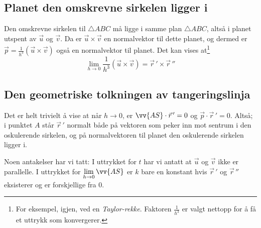 \subsection*{Planet den omskrevne sirkelen ligger i}
Den omskrevne sirkelen til $\triangle ABC$ må ligge i samme plan $\triangle ABC$, altså i planet utspent av $\vec{u}$ og $\vec{v}$. Da er $\vec{u}\times\vec{v}$ en normalvektor til dette planet, og dermed er $\vec{p}=\frac{1}{h^3}(\vec{u}\times\vec{v})$ også en normalvektor til planet. Det kan vises at\footnote{For eksempel, igjen, ved en \textit{Taylor-rekke}. Faktoren $\frac{1}{h^3}$ er valgt nettopp for å få et uttrykk som konvergerer.}
\[ \lim\limits_{h\to0} \frac{1}{h^3}(\vec{u}\times\vec{v})=	\vec{r}\,'\times\vec{r}\,'' \]

\subsection*{Den geometriske tolkningen av tangeringslinja}
Det er helt trivielt å vise at når ${h\to 0}$, er $\vv{AS}\cdot \vec{r}\,'=0$ og $\vec{p}\cdot\vec{r}\,'=0$. Altså; i punktet $A$ står $\vec{r}\,'$ normalt både på vektoren som peker inn mot sentrum i den oskulerende sirkelen, og på normalvektoren til planet den oskulerende sirkelen ligger i.\vsk

Noen antakelser har vi tatt: I uttrykket for $t$ har vi antatt at $\vec{u}$ og $\vec{v}$ ikke er parallelle. I uttrykket for $\lim\limits_{h\to 0} \vv{AS}$ er $k$ bare en konstant hvis $\vec{r}\,'$ og $\vec{r}\,''$ eksisterer og er forskjellige fra 0.
